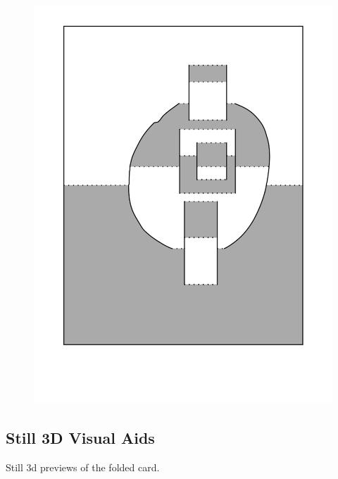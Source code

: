 \begin{figure}[htbp]
\centering
\includegraphics{figures/92_Appendix_Visual_Aids_Materials/shaded_card5.png}
\caption{}
\end{figure}

\subsection{Still 3D Visual Aids}\label{still-3d-visual-aids}

Still 3d previews of the folded card.

